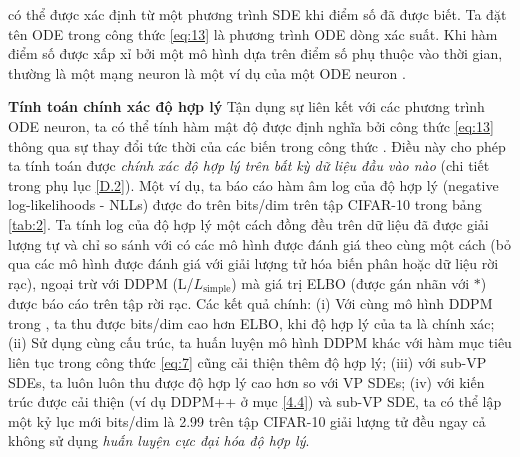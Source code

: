 \documentclass{article} %
\begin{document}
có thể được xác định từ một phương trình SDE khi điểm số đã được biết.
Ta đặt tên ODE trong công thức \ref{eq:13} là phương trình ODE dòng xác suất.
Khi hàm điểm số được xấp xỉ bởi một mô hình dựa trên điểm số phụ thuộc vào thời gian, thường là một mạng neuron là một ví dụ của một ODE neuron \citep{chen2018neural}.

\textbf{Tính toán chính xác độ hợp lý} Tận dụng sự liên kết với các phương trình ODE neuron, ta có thể tính hàm mật độ được định nghĩa bởi công thức \ref{eq:13} thông qua sự thay đổi tức thời của các biến trong công thức \citep{chen2018neural}.
Điều này cho phép ta tính toán được \textit{chính xác độ hợp lý trên bất kỳ dữ liệu đầu vào nào} (chi tiết trong phụ lục \ref{D.2}).
Một ví dụ, ta báo cáo hàm âm log của độ hợp lý (negative log-likelihoods - NLLs) được đo trên bits/dim trên tập CIFAR-10 trong bảng \ref{tab:2}.
Ta tính log của độ hợp lý một cách đồng đều trên dữ liệu đã được giải lượng tự và chỉ so sánh với có các mô hình được đánh giá theo cùng một cách (bỏ qua các mô hình được đánh giá với giải lượng tử hóa biến phân \citep{ho2019flow++} hoặc dữ liệu rời rạc), ngoại trừ với DDPM (L/$L_{\mathrm{simple}}$) mà giá trị ELBO (được gán nhãn với $\ast$) được báo cáo trên tập rời rạc.
Các kết quả chính: (i) Với cùng mô hình DDPM trong \citep{ho2020denoising}, ta thu được bits/dim cao hơn ELBO, khi độ hợp lý của ta là chính xác;
(ii) Sử dụng cùng cấu trúc, ta huấn luyện mô hình DDPM khác với hàm mục tiêu liên tục trong công thức \ref{eq:7} cũng cải thiện thêm độ hợp lý;
(iii) với sub-VP SDEs, ta luôn luôn thu được độ hợp lý cao hơn so với VP SDEs;
(iv) với kiến trúc được cải thiện (ví dụ DDPM++ ở mục \ref{4.4}) và sub-VP SDE, ta có thể lập một kỷ lục mới bits/dim là 2.99 trên tập CIFAR-10 giải lượng tử đều ngay cả không sử dụng \textit{huấn luyện cực đại hóa độ hợp lý}.
\end{document}
